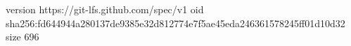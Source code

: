 version https://git-lfs.github.com/spec/v1
oid sha256:fd644944a280137de9385e32d812774e7f5ae45eda246361578245ff01d10d32
size 696

